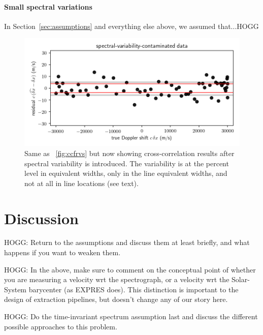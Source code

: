 \documentclass[modern]{aastex631}
\newcommand{\sectionname}{Section}
\newcommand{\secref}[1]{\sectionname~\ref{#1}}
\newcommand{\figref}[1]{\figurename~\ref{#1}}
\begin{document}
\noindent
\paragraph{Small spectral variations}
In \secref{sec:assumptions} and everything else above, we assumed that...HOGG

\begin{figure}[tp]
  \begin{mdframed}
    \begin{center}
    \includegraphics[width=\textwidth]{../notebook/variable.png}
    \end{center}
    \caption{Same as \figref{fig:ccfrvs} but now showing cross-correlation results after spectral variability is introduced. The variability is at the percent level in equivalent widths, only in the line equivalent widths, and not at all in line locations (see text).\label{fig:variable}}
  \end{mdframed}
\end{figure}

\section{Discussion}\label{sec:discussion}

HOGG: Return to the assumptions and discuss them at least briefly, and what happens if you want to weaken them.

HOGG: In the above, make sure to comment on the conceptual point of whether you are measuring a velocity wrt the spectrograph, or a velocity wrt the Solar-System barycenter (as EXPRES does). This distinction is important to the design of extraction pipelines, but doesn't change any of our story here.

HOGG: Do the time-invariant spectrum assumption last and discuss the different possible approaches to this problem.
\end{document}
